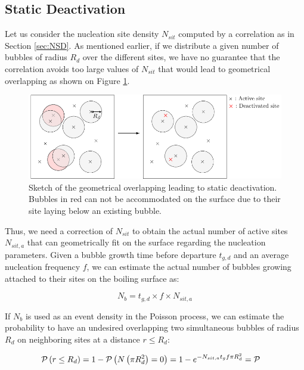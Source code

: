 \subsection{Static Deactivation}



Let us consider the nucleation site density $N_{sit}$ computed by a correlation as in Section \ref{sec:NSD}. As mentioned earlier, if we distribute a given number of bubbles of radius $R_{d}$ over the different sites, we have no guarantee that the correlation avoids too large values of $N_{sit}$ that would lead to geometrical overlapping as shown on Figure \ref{fig:static_deactivation}.

\begin{figure}[!h]
\centering
\includegraphics[width=0.9\linewidth]{img/site_interaction/static_suppression.pdf}
\caption{Sketch of the geometrical overlapping leading to static deactivation. Bubbles in red can not be accommodated on the surface due to their site laying below an existing bubble.}
\label{fig:static_deactivation}
\end{figure}


Thus, we need a correction of $N_{sit}$ to obtain the actual number of active sites $N_{sit,a}$ that can geometrically fit on the surface regarding the nucleation parameters. Given a bubble growth time before departure $t_{g,d}$ and an average nucleation frequency $f$, we can estimate the actual number of bubbles growing attached to their sites on the boiling surface as:

\begin{equation}
N_{b} = t_{g,d}\times f \times N_{sit,a}
\label{eq:bubble_density}
\end{equation}


If $N_{b}$ is used as an event density in the Poisson process, we can estimate the probability to have an undesired overlapping \ie two simultaneous bubbles of radius $R_{d}$ on neighboring sites at a distance $r\leq R_{d}$:

\begin{align}
\mathcal{P}\left( r\leq R_{d} \right) &=1-\mathcal{P}\left( N\left( \pi R_{d}^{2} \right)=0 \right) = 1-e^{-N_{sit,a}t_{g}f\pi R_{d}^{2}} = \mathcal{P}
\end{align}

